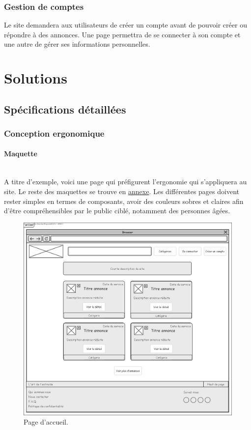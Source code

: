 \documentclass[a4paper,11pt]{article}
\begin{document}
\subsubsection{Gestion de comptes}

Le site demandera aux utilisateurs de créer un compte avant de pouvoir créer ou répondre à des
annonces. Une page permettra de se connecter à son compte et une autre de gérer ses informations
personnelles.\\

\newpage
\section{Solutions}

\subsection{Spécifications détaillées}

\subsubsection{Conception ergonomique}
\paragraph{Maquette}\mbox{} \\

A titre d’exemple, voici une page qui préfigurent l’ergonomie qui s’appliquera
au site. Le reste des maquettes se trouve en \underline{\hyperref[sec:maquettes-annexe]{annexe}}. Les différentes pages doivent rester
simples en termes de composants, avoir des couleurs sobres et claires afin d’être compréhensibles
par le public ciblé, notamment des personnes âgées.\\

\begin{figure}[H]
  \includegraphics[width=\linewidth]{images/maquette-accueil.png}
  \caption{Page d'accueil.}
  \label{fig:maquette-accueil}
\end{figure}
\end{document}
